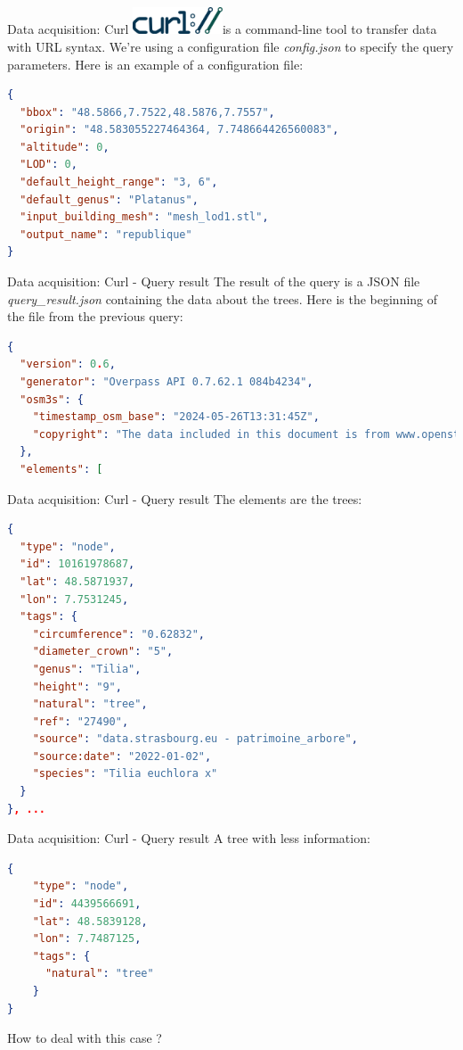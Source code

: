 \documentclass[10pt]{beamer}
\begin{document}
\begin{frame}[fragile]{Data acquisition: Curl}
  \includegraphics[width=0.2\textwidth]{images/Curl-logo.svg.png}is a command-line tool to transfer data with URL syntax.
  We're using a configuration file \textit{config.json} to specify the query parameters.
  Here is an example of a configuration file:
\begin{lstlisting}[language=json]
{
  "bbox": "48.5866,7.7522,48.5876,7.7557",
  "origin": "48.583055227464364, 7.748664426560083",
  "altitude": 0,
  "LOD": 0,
  "default_height_range": "3, 6",
  "default_genus": "Platanus",
  "input_building_mesh": "mesh_lod1.stl",
  "output_name": "republique"
}
\end{lstlisting}
\end{frame}

\begin{frame}[fragile]{Data acquisition: Curl - Query result} 
  The result of the query is a JSON file \textit{query\_result.json} containing the data about the trees.
Here is the beginning of the file from the previous query:

\begin{lstlisting}[language=json]
{
  "version": 0.6,
  "generator": "Overpass API 0.7.62.1 084b4234",
  "osm3s": {
    "timestamp_osm_base": "2024-05-26T13:31:45Z",
    "copyright": "The data included in this document is from www.openstreetmap.org. The data is made available under ODbL."
  },
  "elements": [
\end{lstlisting}
\end{frame}

\begin{frame}[fragile]{Data acquisition: Curl - Query result}
 The elements are the trees:

\begin{lstlisting}[language=json]
{
  "type": "node",
  "id": 10161978687,
  "lat": 48.5871937,
  "lon": 7.7531245,
  "tags": {
    "circumference": "0.62832",
    "diameter_crown": "5",
    "genus": "Tilia",
    "height": "9",
    "natural": "tree",
    "ref": "27490",
    "source": "data.strasbourg.eu - patrimoine_arbore",
    "source:date": "2022-01-02",
    "species": "Tilia euchlora x"
  }
}, ...
\end{lstlisting}
\end{frame}

\begin{frame}[fragile]{Data acquisition: Curl - Query result}
  A tree with less information:

\begin{lstlisting}[language=json]
{
    "type": "node",
    "id": 4439566691,
    "lat": 48.5839128,
    "lon": 7.7487125,
    "tags": {
      "natural": "tree"
    }
}
\end{lstlisting}
\vfill
How to deal with this case ?
\end{frame}
\end{document}
